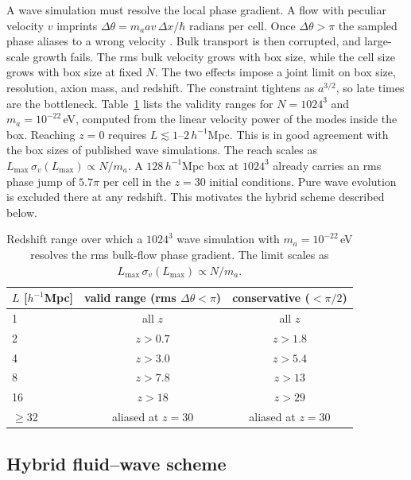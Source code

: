 \documentclass[11pt,a4paper]{article}
\begin{document}
A wave simulation must resolve the local phase gradient. A flow
with peculiar velocity $v$ imprints
$\Delta\theta = m_a a v\,\Delta x/\hbar$ radians per cell. Once
$\Delta\theta>\pi$ the sampled phase aliases to a wrong velocity
\citep{MaySpringel2021}. Bulk transport is then corrupted, and
large-scale growth fails. The rms bulk velocity grows with box
size, while the cell size grows with box size at fixed $N$. The
two effects impose a joint limit on box size, resolution, axion
mass, and redshift. The constraint tightens as $a^{3/2}$, so late
times are the bottleneck. Table~\ref{tab:fdm_box} lists the
validity ranges for $N=1024^3$ and $m_a=10^{-22}\,$eV, computed
from the linear velocity power of the modes inside the box.
Reaching $z=0$ requires $L\lesssim1$--$2\,h^{-1}$Mpc. This is in
good agreement with the box sizes of published wave simulations.
The reach scales as
$L_{\max}\,\sigma_v(L_{\max})\propto N/m_a$. A $128\,h^{-1}$Mpc
box at $1024^3$ already carries an rms phase jump of $5.7\pi$ per
cell in the $z=30$ initial conditions. Pure wave evolution is
excluded there at any redshift. This motivates the hybrid scheme
described below.

\begin{table}
\centering
\begin{tabular}{lcc}
\toprule
$L$ [$h^{-1}$Mpc] & valid range (rms $\Delta\theta<\pi$) &
conservative ($<\pi/2$) \\
\midrule
1  & all $z$    & all $z$ \\
2  & $z>0.7$    & $z>1.8$ \\
4  & $z>3.0$    & $z>5.4$ \\
8  & $z>7.8$    & $z>13$  \\
16 & $z>18$     & $z>29$  \\
$\ge$32 & aliased at $z=30$ & aliased at $z=30$ \\
\bottomrule
\end{tabular}
\caption{Redshift range over which a $1024^3$ wave simulation with
$m_a=10^{-22}$\,eV resolves the rms bulk-flow phase gradient. The
limit scales as $L_{\max}\,\sigma_v(L_{\max})\propto N/m_a$.}
\label{tab:fdm_box}
\end{table}

\subsection{Hybrid fluid--wave scheme}
\label{sec:fdm_hybrid}
\end{document}
